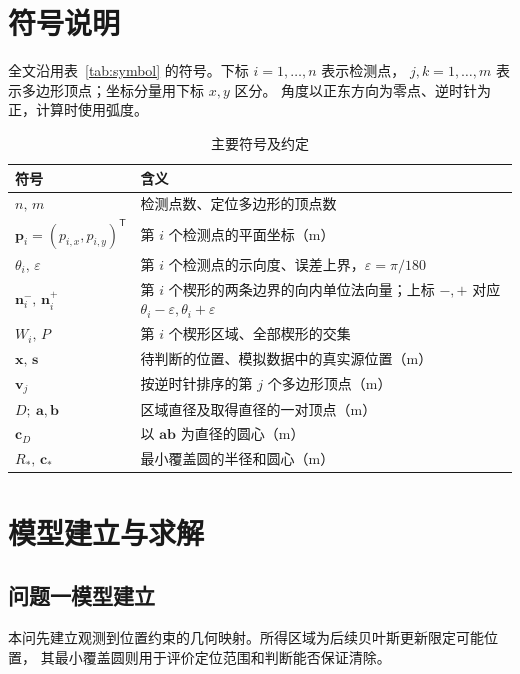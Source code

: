 \documentclass[UTF8,a4paper,12pt]{ctexart}
\begin{document}
\section{符号说明}
全文沿用表~\ref{tab:symbol} 的符号。下标 $i=1,\ldots,n$ 表示检测点，
$j,k=1,\ldots,m$ 表示多边形顶点；坐标分量用下标 $x,y$ 区分。
角度以正东方向为零点、逆时针为正，计算时使用弧度。
\begin{table}[htbp]
  \centering
  \caption{主要符号及约定}
  \label{tab:symbol}
  \label{tab:q1-symbols}
  \begin{tabularx}{\linewidth}{lX}
    \toprule
    符号 & 含义 \\
    \midrule
    $n,\,m$ & 检测点数、定位多边形的顶点数 \\
    $\boldsymbol p_i=(p_{i,x},p_{i,y})^{\mathsf T}$ & 第 $i$ 个检测点的平面坐标（$\mathrm m$） \\
    $\theta_i,\,\varepsilon$ & 第 $i$ 个检测点的示向度、误差上界，$\varepsilon=\pi/180$ \\
    $\boldsymbol n_i^-,\,\boldsymbol n_i^+$ & 第 $i$ 个楔形的两条边界的向内单位法向量；上标 $-,+$ 对应 $\theta_i-\varepsilon,\theta_i+\varepsilon$ \\
    $W_i,\,P$ & 第 $i$ 个楔形区域、全部楔形的交集 \\
    $\boldsymbol x,\,\boldsymbol s$ & 待判断的位置、模拟数据中的真实源位置（$\mathrm m$） \\
    $\boldsymbol v_j$ & 按逆时针排序的第 $j$ 个多边形顶点（$\mathrm m$） \\
    $D;\ \boldsymbol a,\boldsymbol b$ & 区域直径及取得直径的一对顶点（$\mathrm m$） \\
    $\boldsymbol c_D$ & 以 $\boldsymbol a\boldsymbol b$ 为直径的圆心（$\mathrm m$） \\
    $R_*,\,\boldsymbol c_*$ & 最小覆盖圆的半径和圆心（$\mathrm m$） \\
    \bottomrule
  \end{tabularx}
\end{table}

\FloatBarrier
\section{模型建立与求解}
\subsection{问题一模型建立}
\label{sec:q1}

本问先建立观测到位置约束的几何映射。所得区域为后续贝叶斯更新限定可能位置，
其最小覆盖圆则用于评价定位范围和判断能否保证清除。
\end{document}
